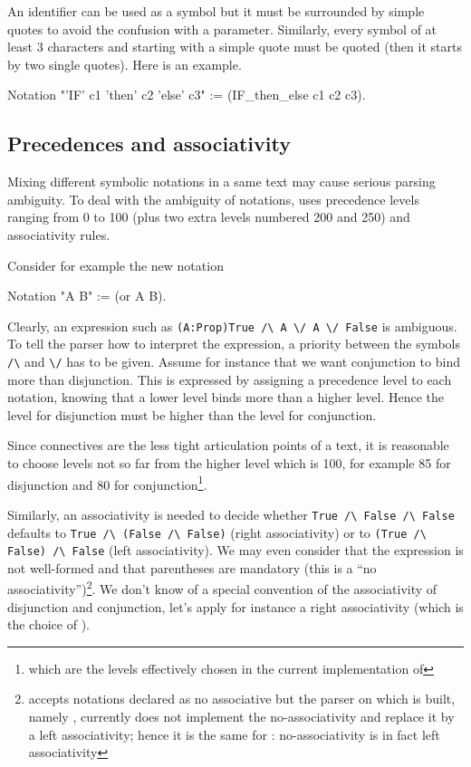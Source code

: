 An identifier can be used as a symbol but it must be surrounded by
simple quotes to avoid the confusion with a parameter. Similarly,
every symbol of at least 3 characters and starting with a simple quote
must be quoted (then it starts by two single quotes). Here is an example.

\begin{coq_example*}
Notation "'IF' c1 'then' c2 'else' c3" := (IF_then_else c1 c2 c3).
\end{coq_example*}


\subsection{Precedences and associativity}

Mixing different symbolic notations in a same text may cause serious
parsing ambiguity. To deal with the ambiguity of notations, {\Coq}
uses precedence levels ranging from 0 to 100 (plus two extra levels
numbered 200 and 250) and associativity rules.

Consider for example the new notation

\begin{coq_example*}
Notation "A \/ B" := (or A B).
\end{coq_example*}

Clearly, an expression such as {\tt (A:Prop)True \verb=/\= A \verb=\/=
A \verb=\/= False} is ambiguous. To tell the {\Coq} parser how to
interpret the expression, a priority between the symbols \verb=/\= and
\verb=\/= has to be given. Assume for instance that we want conjunction
to bind more than disjunction. This is expressed by assigning a
precedence level to each notation, knowing that a lower level binds
more than a higher level.  Hence the level for disjunction must be
higher than the level for conjunction.

Since connectives are the less tight articulation points of a text, it
is reasonable to choose levels not so far from the higher level which
is 100, for example 85 for disjunction and 80 for
conjunction\footnote{which are the levels effectively chosen in the
current implementation of {\Coq}}.

Similarly, an associativity is needed to decide whether {\tt True \verb=/\=
False \verb=/\= False} defaults to {\tt True \verb=/\= (False
\verb=/\= False)} (right associativity) or to {\tt (True
\verb=/\= False) \verb=/\= False} (left associativity). We may
even consider that the expression is not well-formed and that
parentheses are mandatory (this is a ``no associativity'')\footnote{
{\Coq} accepts notations declared as no associative but the parser on
which {\Coq} is built, namely {\camlpppp}, currently does not implement the
no-associativity and replace it by a left associativity; hence it is
the same for {\Coq}: no-associativity is in fact left associativity}.
We don't know of a special convention of the associativity of
disjunction and conjunction, let's apply for instance a right
associativity (which is the choice of {\Coq}).

